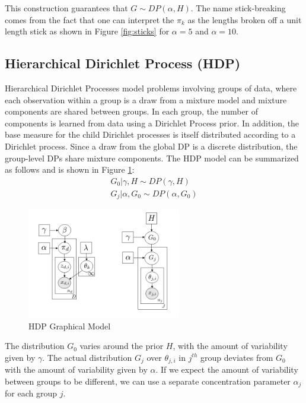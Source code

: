 This construction guarantees that $G\sim DP(\alpha, H)$. The name stick-breaking comes from the fact that one can interpret the $\pi_k$ as the lengths broken off a unit length stick as shown in Figure \ref{fig:sticks} for $\alpha=5$ and $\alpha=10$.

\subsection{Hierarchical Dirichlet Process (HDP)}


Hierarchical Dirichlet Processes model problems involving groups of data, where each observation within a group is a draw from a mixture model and mixture components are shared between groups. In each group, the number of components is learned from data using a Dirichlet Process prior. In addition, the base measure for the child Dirichlet processes is itself distributed according to a Dirichlet process. Since a draw from the global DP is a discrete distribution, the group-level DPs share mixture components. 
The HDP model can be summarized as follows and is shown in Figure \ref{fig:hdp_gm}:
\begin{eqnarray}
   G_0 | \gamma, H \sim DP(\gamma, H)\\
   G_j | \alpha, G_0 \sim DP(\alpha, G_0)
\end{eqnarray}
\begin{figure}[tbhp]
    \centering
    \includegraphics[width=0.6\textwidth, trim={10 10 10 10}]{figures/hdp_gm.png}
    \caption{HDP Graphical Model}
    \label{fig:hdp_gm}
\end{figure}
The distribution $G_0$ varies around the prior $H$, with the amount of variability given by $\gamma$. The actual distribution $G_j$ over $\theta_{j,i}$ in $j^{th}$ group deviates from $G_0$ with the amount of variability given by $\alpha$. If we expect the amount of variability between groups to be different, we can use a separate concentration parameter $\alpha_j$ for each group $j$.\\

